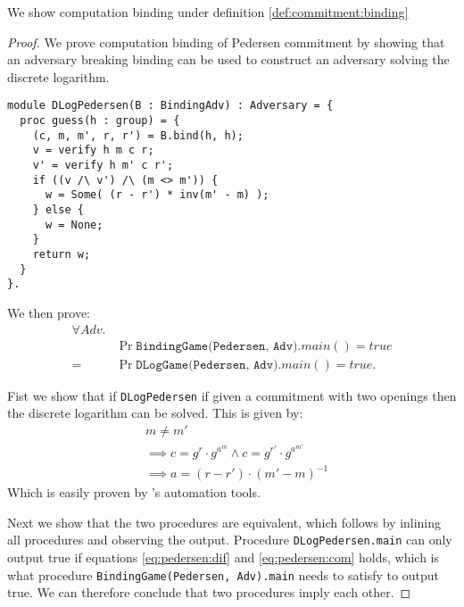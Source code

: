 \begin{lemma}
  We show computation binding under definition \ref{def:commitment:binding}
\end{lemma}
\begin{proof}
  We prove computation binding of Pedersen commitment by showing that an
  adversary breaking binding can be used to construct an adversary solving the discrete logarithm.

\begin{lstlisting}
module DLogPedersen(B : BindingAdv) : Adversary = {
  proc guess(h : group) = {
    (c, m, m', r, r') = B.bind(h, h);
    v = verify h m c r;
    v' = verify h m' c r';
    if ((v /\ v') /\ (m <> m')) {
      w = Some( (r - r') * inv(m' - m) );
    } else {
      w = None;
    }
    return w;
  }
}.
\end{lstlisting}

  We then prove:
  \begin{align*}
    \forall Adv.& \\
    &\Pr{\texttt{BindingGame(Pedersen, Adv)}.main() = true} \\
    = &\Pr{\texttt{DLogGame(Pedersen, Adv)}.main() = true}.
  \end{align*}

  Fist we show that if \texttt{DLogPedersen} if given a commitment with two
  openings then the discrete logarithm can be solved. This is given by:
  \begin{align}
    &m \neq m' \label{eq:pedersen:dif}\\
    &\implies c = g^{r} \cdot g^{a^{m}} \land c = g^{r'} \cdot g^{a^{m'}} \label{eq:pedersen:com}\\
    &\implies a = (r - r') \cdot (m' - m)^{-1}
  \end{align}
  Which is easily proven by \easycrypt's automation tools.

  Next we show that the two procedures are equivalent, which follows by inlining
  all procedures and observing the output.
  Procedure \texttt{DLogPedersen.main} can only output true if equations
  \ref{eq:pedersen:dif} and \ref{eq:pedersen:com} holds, which is what procedure
  \texttt{BindingGame(Pedersen, Adv).main} needs to satisfy to output true. We
  can therefore conclude that two procedures imply each other.
\end{proof}

